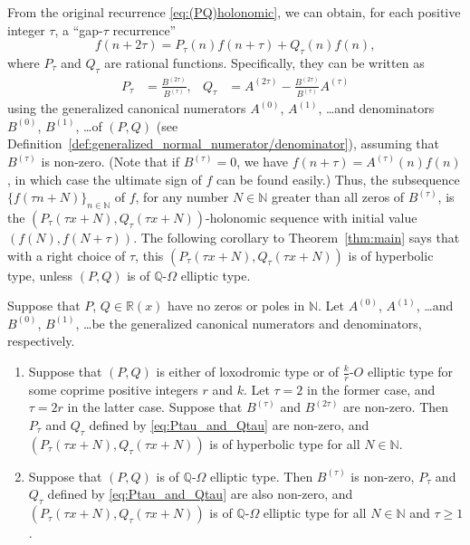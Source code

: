 \documentclass[a4paper,UKenglish,cleveref,autoref,thm-restate]{lipics-v2021}
\newcommand{\R}{\mathbb{R}}
\newcommand{\N}{\mathbb{N}}
\newcommand{\Q}{\mathbb{Q}}
\begin{document}
From the original recurrence \eqref{eq:(PQ)holonomic}, 
we can obtain, for each positive integer $\tau$, a ``gap-$\tau$ recurrence'' 
\begin{equation} \label{eq:f2tau=Pftau+Qf}
f(n+2\tau) = P_{\tau}(n) f(n+\tau) + Q_{\tau}(n) f(n), 
\end{equation}
where $P _\tau$ and $Q _\tau$ are rational functions.
Specifically, they can be written as
\begin{align} \label{eq:Ptau_and_Qtau}
P_{\tau} & = \frac{B^{(2\tau)}}{B^{(\tau)}}, 
&
Q_{\tau} & = A^{(2\tau)} - \frac{B^{(2\tau)}}{B^{(\tau)}} A^{(\tau)}
\end{align}
using the generalized canonical numerators $A ^{(0)}$, $A ^{(1)}$, \ldots and denominators $B ^{(0)}$, $B ^{(1)}$, \ldots of $(P, Q)$
(see Definition~\ref{def:generalized_normal_numerator/denominator}),
assuming that $B ^{(\tau)}$ is non-zero. 
(Note that if $B ^{(\tau)} = 0$, we have $f (n + \tau) = A ^{(\tau)} (n) f (n)$,
in which case the ultimate sign of $f$ can be found easily.)
Thus,
the subsequence $\{ f(\tau n + N ) \}_{n \in \N}$ of $f$, 
for any number $N \in \N$ greater than all zeros of $B ^{(\tau)}$, 
is the $(P_{\tau}(\tau x + N), Q_{\tau}(\tau x + N))$-holonomic sequence 
with initial value $(f(N), f(N + \tau)) $.
The following corollary to Theorem~\ref{thm:main} says that
with a right choice of $\tau$,
this $(P_{\tau}(\tau x + N), Q_{\tau}(\tau x + N))$ is of hyperbolic type, 
unless $(P, Q)$ is of $\Q$-$\Omega$ elliptic type. 

\begin{corollary}
\label{cor:hyperbolic subsequence}
Suppose that $P$, $Q \in \R (x)$ have no zeros or poles in $\N$.
Let $A^{(0)}$, $A^{(1)}$, \dots and $B^{(0)}$, $B^{(1)}$, \dots be the generalized canonical numerators and denominators, respectively. 
\begin{enumerate}[(1)]
\item \label{item:lox_or_k/r-O_elliptic->hyepr} 
Suppose that 
$(P, Q)$ is either of loxodromic type
or of $\frac k r$-$O$ elliptic type for some coprime positive integers $r$ and $k$.
Let $\tau = 2$ in the former case,
and $\tau = 2 r$ in the latter case. 
Suppose that $B ^{(\tau)}$ and $B ^{(2 \tau)}$ are non-zero. 
Then 
$P _\tau$ and $Q _\tau$ defined by \eqref{eq:Ptau_and_Qtau} are non-zero, 
and $(P _\tau (\tau x + N), Q _\tau (\tau x + N))$ is of hyperbolic type for all $N \in \N$.
\item \label{item:Q-Omega_elliptic->Q-Omega_elliptic} 
Suppose that
$(P, Q)$ is of $\Q$-$\Omega$ elliptic type.
Then $B ^{(\tau)}$ is non-zero, $P _\tau$ and $Q _\tau$ defined by \eqref{eq:Ptau_and_Qtau} are also non-zero,
and 
$(P _\tau (\tau x + N), Q _\tau (\tau x + N))$ is of $\Q$-$\Omega$ elliptic type for all $N \in \N$ and $\tau \geq 1$.
\end{enumerate}
\end{corollary}
\end{document}
